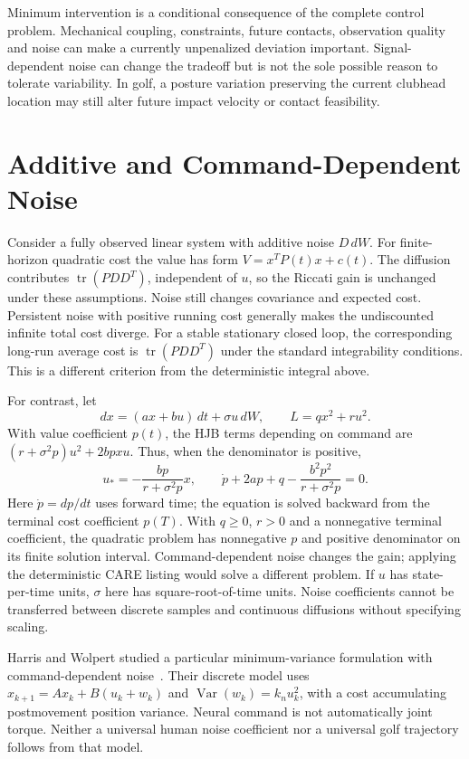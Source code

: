 Minimum intervention is a conditional consequence of the complete control
problem. Mechanical coupling, constraints, future contacts, observation
quality and noise can make a currently unpenalized deviation important.
Signal-dependent noise can change the tradeoff but is not the sole possible
reason to tolerate variability. In golf, a posture variation preserving the
current clubhead location may still alter future impact velocity or contact
feasibility.

\section{Additive and Command-Dependent Noise}

Consider a fully observed linear system with additive noise $D\,dW$.
For finite-horizon quadratic cost the value has form $V=x^TP(t)x+c(t)$.
The diffusion
contributes $\operatorname{tr}(PDD^T)$, independent of $u$, so the Riccati
gain is unchanged under these assumptions. Noise still changes covariance
and expected cost. Persistent noise with positive running cost generally
makes the undiscounted infinite total cost diverge. For a stable stationary
closed loop, the corresponding long-run average cost is
$\operatorname{tr}(PDD^T)$ under the standard integrability conditions.
This is a different criterion from the deterministic integral above.

For contrast, let
\begin{equation}
 dx=(ax+bu)\,dt+\sigma u\,dW,\qquad L=qx^2+ru^2.
\end{equation}
With value coefficient $p(t)$, the HJB terms depending on command are
$(r+\sigma^2p)u^2+2bpxu$. Thus, when the denominator is positive,
\begin{equation}
 u_*=-\frac{bp}{r+\sigma^2p}x,\qquad
 \dot p+2ap+q-\frac{b^2p^2}{r+\sigma^2p}=0.
\end{equation}
Here $\dot p=dp/dt$ uses forward time; the equation is solved backward
from the terminal cost coefficient $p(T)$. With $q\geq0$, $r>0$ and a
nonnegative terminal coefficient, the quadratic problem has nonnegative
$p$ and positive denominator on its finite solution interval.
Command-dependent noise
changes the gain; applying the deterministic CARE listing would solve a
different problem. If $u$ has state-per-time units, $\sigma$ here has
square-root-of-time units. Noise coefficients cannot be transferred between
discrete samples and continuous diffusions without specifying scaling.

Harris and Wolpert studied a particular minimum-variance formulation with
command-dependent noise~\cite{HarrisWolpert1998}. Their discrete model uses
$x_{k+1}=Ax_k+B(u_k+w_k)$ and $\operatorname{Var}(w_k)=k_nu_k^2$,
with a cost accumulating postmovement position variance. Neural command is
not automatically joint torque. Neither a universal human noise coefficient
nor a universal golf trajectory follows from that model.

